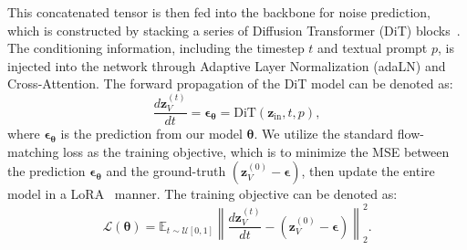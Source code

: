 \documentclass[runningheads]{llncs}
\begin{document}
This concatenated tensor is then fed into the backbone for noise prediction,
which is constructed by stacking a series of Diffusion Transformer (DiT) blocks~\cite{dit}. 
The conditioning information, including the timestep $t$ and textual prompt $p$, is injected into the network through Adaptive Layer Normalization (adaLN) and Cross-Attention. The forward propagation of the DiT model can be denoted as:
\begin{equation}
    \frac{d\mathbf{z}_V^{(t)}}{dt}=\boldsymbol{\epsilon}_{\mathbf{\theta}} = \text{DiT}(\mathbf{z}_{\text{in}}, t, p),
    \label{eq:forward_pass}
\end{equation}
where $\boldsymbol{\epsilon}_{\mathbf{\theta}}$ is the prediction from our model $\mathbf{\theta}$.
We utilize the standard flow-matching loss as the training objective, which is to minimize the MSE between the prediction $\boldsymbol{\epsilon}_{\mathbf{\theta}}$ and the ground-truth $(\mathbf{z}_V^{(0)} - \boldsymbol{\epsilon})$, then update the entire model in a LoRA~\cite{lora} manner. The training objective can be denoted as:
\begin{equation}
    \mathcal{L}(\mathbf{\theta}) = \mathbb{E}_{t \sim \mathcal{U}[0, 1]} \left\| \frac{d\mathbf{z}_V^{(t)}}{dt} - (\mathbf{z}_V^{(0)} - \boldsymbol{\epsilon}) \right\|^2_2.
\end{equation}

\end{document}
